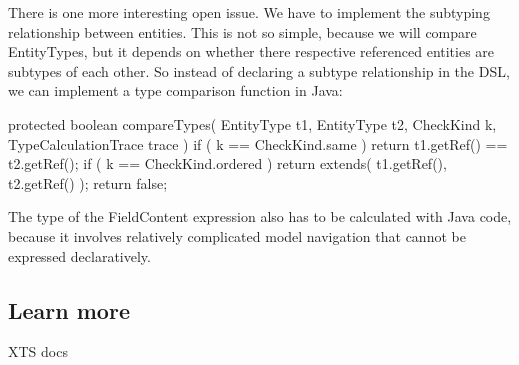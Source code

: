 There is one more interesting open issue. We have to implement the subtyping
relationship between entities. This is not so simple, because we will compare 
EntityTypes, but it depends on whether there respective referenced entities are
subtypes of each other. So instead of declaring a subtype relationship
in the DSL, we can implement a type comparison function in Java:

\begin{code}
    protected boolean compareTypes( EntityType t1, EntityType t2, CheckKind k, TypeCalculationTrace trace ) {
        if ( k == CheckKind.same ) return t1.getRef() == t2.getRef();
        if ( k == CheckKind.ordered ) return extends( t1.getRef(), t2.getRef() );
        return false; 
    }
\end{code}








The type of the FieldContent expression also has to be calculated with Java
code, because it involves relatively complicated model navigation that cannot be
expressed declaratively.








\subsection{Learn more}

XTS docs
  